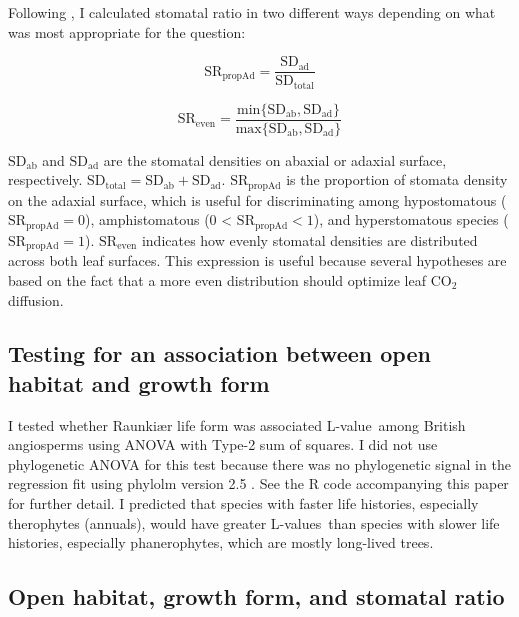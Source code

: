 \documentclass[12pt, oneside]{article}
\newcommand{\pkg}[1]{{\fontseries{b}\selectfont #1}}
\newcommand{\el}{L-value}
\newcommand{\els}{L-values}
\begin{document}
Following \cite{Muir_2015}, I calculated stomatal ratio in two different ways depending on what was most appropriate for the question: 

\begin{equation} \label{eq:SRpropAd} 
  \mathrm{SR_{propAd}} = \frac{\mathrm{SD_{ad}}}{\mathrm{SD_{total}}}
\end{equation}

\begin{equation} \label{eq:SReven1} 
  \mathrm{SR_{even}} = \frac{\mathrm{min}\{\mathrm{SD_{ab}}, \mathrm{SD_{ad}}\}}{\mathrm{max}\{\mathrm{SD_{ab}}, \mathrm{SD_{ad}}\}}
\end{equation}

$\mathrm{SD_{ab}}$ and $\mathrm{SD_{ad}}$ are the stomatal densities on abaxial or adaxial surface, respectively. $\mathrm{SD_{total}} = \mathrm{SD_{ab}} + \mathrm{SD_{ad}}$. $\mathrm{SR_{propAd}}$ is the proportion of stomata density on the adaxial surface, which is useful for discriminating among hypostomatous ($\mathrm{SR_{propAd}} = 0$), amphistomatous (0 < $\mathrm{SR_{propAd}} < 1$), and hyperstomatous species ($\mathrm{SR_\mathrm{propAd}} = 1$). $\mathrm{SR_\mathrm{even}}$ indicates how evenly stomatal densities are distributed across both leaf surfaces. This expression is useful because several hypotheses are based on the fact that a more even distribution should optimize leaf CO$_2$ diffusion.

\subsection*{Testing for an association between open habitat and growth form}

I tested whether Raunki\ae r life form was associated \el~among British angiosperms using ANOVA with Type-2 sum of squares. I did not use phylogenetic ANOVA for this test because there was no phylogenetic signal in the regression fit using \pkg{phylolm} version 2.5 \citep{Ho_Ane_2014}. See the R code accompanying this paper for further detail. I predicted that species with faster life histories, especially therophytes (annuals), would have greater \els~than species with slower life histories, especially phanerophytes, which are mostly long-lived trees. 

\subsection*{Open habitat, growth form, and stomatal ratio}
\end{document}
